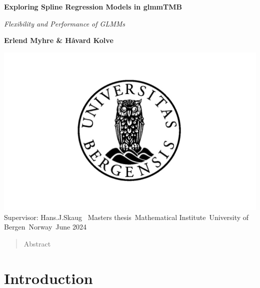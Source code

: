 \documentclass[12pt, twoside,hidelinks]{article}
\theoremstyle{definition}
\numberwithin{equation}{section}
\begin{document}
	
	
	\begin{titlepage}
		\begin{center}
			\vspace*{1cm}
			
			
			\textbf{\Huge Exploring Spline Regression Models in glmmTMB}
			
			\vspace{0.5cm}
			
			\textit{\Large Flexibility and Performance of GLMMs}
			
	       
            \vspace{1.0cm}
            \large
            \textbf{Erlend Myhre \& Håvard Kolve}


            \vfill


            \vspace{0.8cm}

            \includegraphics[width=1\textwidth]{university.jpg}
            \Large
            Supervisor: Hans.J.Skaug\
            \large
            Masters thesis\
            Mathematical Institute\
            University of Bergen\
            Norway\
            \small  June 2024

        \end{center}
    \end{titlepage}
	
	\large
	\begin{abstract}
	Abstract
	\end{abstract}
	
	\newpage
	\tableofcontents
	\newpage
	\large
	\section*{Introduction}
\end{document}
